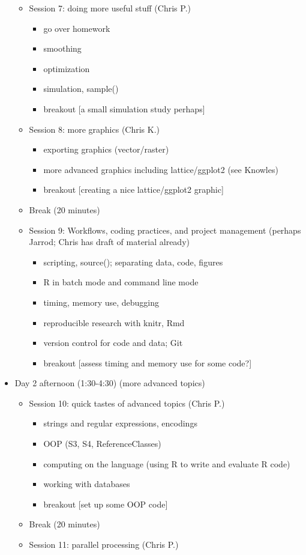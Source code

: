 \documentclass[12pt]{article}\usepackage{graphicx, color}
\begin{document}
\begin{itemize}
\begin{itemize}
\item Session 7: doing more useful stuff (Chris P.)

\begin{itemize}
\item go over homework
\item smoothing
\item optimization
\item simulation, sample()
\item breakout {[}a small simulation study perhaps{]}
\end{itemize}
\item Session 8: more graphics (Chris K.)

\begin{itemize}
\item exporting graphics (vector/raster)
\item more advanced graphics including lattice/ggplot2 (see Knowles) 
\item breakout {[}creating a nice lattice/ggplot2 graphic{]}
\end{itemize}
\item Break (20 minutes)
\item Session 9: Workflows, coding practices, and project management (perhaps
Jarrod; Chris has draft of material already)

\begin{itemize}
\item scripting, source(); separating data, code, figures
\item R in batch mode and command line mode
\item timing, memory use, debugging
\item reproducible research with knitr, Rmd
\item version control for code and data; Git
\item breakout {[}assess timing and memory use for some code?{]}
\end{itemize}
\end{itemize}
\item Day 2 afternoon (1:30-4:30) (more advanced topics) 

\begin{itemize}
\item Session 10: quick tastes of advanced topics (Chris P.)

\begin{itemize}
\item strings and regular expressions, encodings
\item OOP (S3, S4, ReferenceClasses)
\item computing on the language (using R to write and evaluate R code)
\item working with databases
\item breakout {[}set up some OOP code{]}
\end{itemize}
\item Break (20 minutes)
\item Session 11: parallel processing (Chris P.)


\end{itemize}
\end{itemize}
\end{document}
